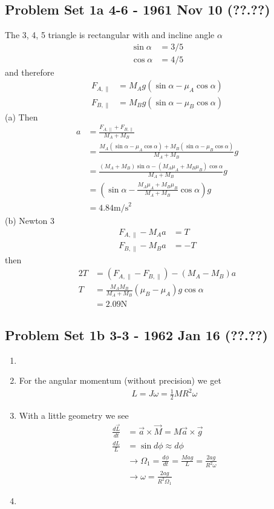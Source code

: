 \documentclass[10pt,a4paper]{book}
\theoremstyle{definition}
\begin{document}
\subsection{Problem Set 1a 4-6 - 1961 Nov 10 (??.??)}
The 3, 4, 5 triangle is rectangular with and incline angle $\alpha$
\begin{align}
\sin\alpha&=3/5\\
\cos\alpha&=4/5
\end{align}
and therefore
\begin{align}
F_{A,\parallel}&=M_Ag(\sin\alpha-\mu_A\cos\alpha)\\
F_{B,\parallel}&=M_Bg(\sin\alpha-\mu_B\cos\alpha)
\end{align}
(a) Then
\begin{align}
a
&=\frac{F_{A,\parallel}+F_{B,\parallel}}{M_A+M_B}\\
&=\frac{M_A(\sin\alpha-\mu_A\cos\alpha)+M_B(\sin\alpha-\mu_B\cos\alpha)}{M_A+M_B}g\\
&=\frac{(M_A+M_B)\sin\alpha-(M_A\mu_A+M_B\mu_B)\cos\alpha}{M_A+M_B}g\\
&=\left(\sin\alpha-\frac{M_A\mu_A+M_B\mu_B}{M_A+M_B}\cos\alpha\right)g\\
&=4.84\text{m/s}^2
\end{align}
(b) Newton 3
\begin{align}
F_{A,\parallel}-M_Aa&=T\\
F_{B,\parallel}-M_Ba&=-T
\end{align}
then
\begin{align}
2T
&=(F_{A,\parallel}-F_{B,\parallel})-(M_A-M_B)a\\
T&=\frac{M_AM_B}{M_A+M_B}(\mu_B-\mu_A)g\cos\alpha\\
&=2.09\text{N}
\end{align}


\subsection{Problem Set 1b 3-3 - 1962 Jan 16 (??.??)}
\begin{enumerate}
    \item 
    \item For the angular momentum (without precision) we get
    \begin{align}
        L=J\omega=\frac{1}{2}MR^2\omega
    \end{align}
    \item With a little geometry we see
    \begin{align}
        \frac{d\vec{L}}{dt}&=\vec{a}\times\vec{M}=M\vec{a}\times\vec{g}\\
        \frac{dL}{L}&=\sin d\phi\approx d\phi\\
        &\rightarrow\Omega_1=\frac{d\phi}{dt}=\frac{Mag}{L}=\frac{2ag}{R^2\omega}\\
        &\rightarrow\omega=\frac{2ag}{R^2\Omega_1}
    \end{align}
    \item
\end{enumerate}
\end{document}
